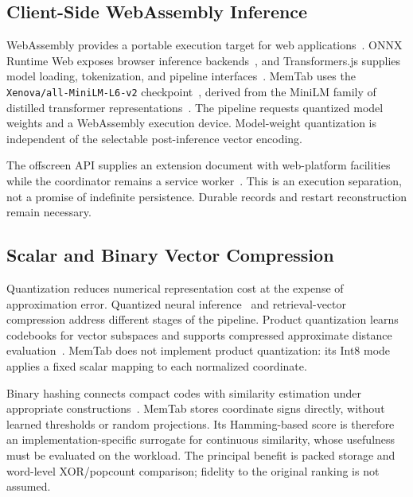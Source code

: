 \documentclass[conference]{IEEEtran}
\newcommand{\checkpoint}{\texttt{Xenova/all-MiniLM-L6-v2}}
\begin{document}
\subsection{Client-Side WebAssembly Inference}
WebAssembly provides a portable execution target for web
applications~\cite{haas2017wasm}. ONNX Runtime Web exposes browser inference
backends~\cite{onnxruntimeweb}, and Transformers.js supplies model loading,
tokenization, and pipeline interfaces~\cite{transformersjs}. MemTab uses the
\checkpoint{} checkpoint~\cite{minilmcheckpoint}, derived from the MiniLM
family of distilled transformer representations~\cite{wang2020minilm}.
The pipeline requests quantized model weights and a WebAssembly execution
device. Model-weight quantization is independent of the selectable
post-inference vector encoding.

The offscreen API supplies an extension document with web-platform facilities
while the coordinator remains a service worker~\cite{chromeoffscreen}.
This is an execution separation, not a promise of indefinite persistence.
Durable records and restart reconstruction remain necessary.

\subsection{Scalar and Binary Vector Compression}
Quantization reduces numerical representation cost at the expense of
approximation error. Quantized neural inference~\cite{jacob2018quantization}
and retrieval-vector compression address different stages of the pipeline.
Product quantization learns codebooks for vector subspaces and supports
compressed approximate distance evaluation~\cite{jegou2011pq}. MemTab does
not implement product quantization: its Int8 mode applies a fixed scalar
mapping to each normalized coordinate.

Binary hashing connects compact codes with similarity estimation under
appropriate constructions~\cite{charikar2002hashing}. MemTab stores coordinate
signs directly, without learned thresholds or random projections. Its
Hamming-based score is therefore an implementation-specific surrogate for
continuous similarity, whose usefulness must be evaluated on the workload.
The principal benefit is packed storage and word-level XOR/popcount
comparison; fidelity to the original ranking is not assumed.
\end{document}
